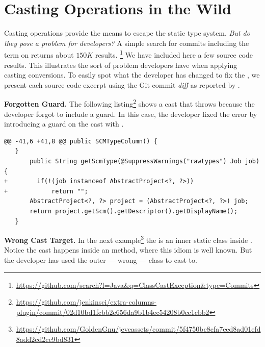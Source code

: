 
\newcommand{\ctag}[1]{\textsl{#1}}
\newcommand{\cpattern}[1]{\textsc{#1}}

\chapter{Casting Operations in the Wild}
\label{cha:casts}


Casting operations provide the means to escape the static type system.
\emph{But do they pose a problem for developers?}
A simple search for
commits
including the term  on \github{} returns about
$150K$
results.%
\footnote{\url{https://github.com/search?l=Java&q=ClassCastException&type=Commits}}
We have included here a few source code results.
This illustrates the sort of problem developers have when applying casting conversions.
To easily spot what the developer has changed to fix the ,
we present each source code excerpt using the Git commit \emph{diff} as reported by \github{}.

\textbf{Forgotten Guard.}
The following listing\footnote{\url{https://github.com/jenkinsci/extra-columns-plugin/commit/02d10bd1fcbb2e656da9b1b4ec54208b0cc1cbb2}}
shows a cast that throws  because the developer forgot to include a guard.
In this case, the developer fixed the error by introducing a guard on the cast with .

\begin{lstlisting}[style=java]
@@ -41,6 +41,8 @@ public SCMTypeColumn() {
   }
       public String getScmType(@SuppressWarnings("rawtypes") Job job) {
+        if(!(job instanceof AbstractProject<?, ?>))
+            return "";
       AbstractProject<?, ?> project = (AbstractProject<?, ?>) job;
       return project.getScm().getDescriptor().getDisplayName();
   }
\end{lstlisting}

\textbf{Wrong Cast Target.}
In the next example\footnote{\url{https://github.com/GoldenGnu/jeveassets/commit/5f4750bc8cfa7eed8ad01efd8add2cd2cc9bd831}}
the  is an inner static class inside .
Notice the cast happens inside an  method, where this idiom is well known.
But the developer has used the outer --- wrong --- class to cast to.

